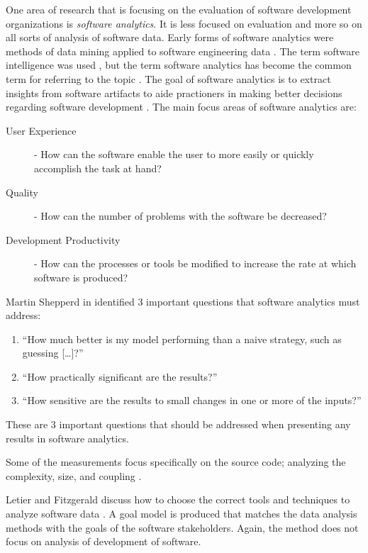 \documentclass[SDSUThesis.tex]{subfiles}
\begin{document}
One area of research that is focusing on the evaluation of software development organizations
is \textit{software analytics}.  It is less focused on evaluation
and more so on all sorts of analysis of software data.  Early forms of 
software analytics were methods of data mining applied to software engineering data
\cite{Kaner2004,Xie2009,Taylor2010,Halkidi2011}. The term software intelligence was 
used \cite{Hassan2010}, but
the term software analytics has become the common term for referring to the topic \cite{Zhang2011}.
The goal of software analytics is to extract insights
from software artifacts to aide practioners in making better decisions regarding software
development \cite{Zhang2013}.  The main focus areas of software analytics are:
\begin{description}
    \item[User Experience] - How can the software enable the user to more easily or quickly 
        accomplish the task at hand?
    \item[Quality] - How can the number of problems with the software be decreased?
    \item[Development Productivity] - How can the processes or tools be modified to increase 
        the rate at which software is produced? 
\end{description}

Martin Shepperd in \cite{Hassan2013} identified 3 important questions that software
analytics must address:
\begin{enumerate}
    \item ``How much better is my model performing than a naive strategy, such as guessing [\ldots]?''
    \item ``How practically significant are the results?''
    \item ``How sensitive are the results to small changes in one or more of the inputs?''
\end{enumerate}
These are 3 important questions that should be addressed when presenting any results in
software analytics.

Some of the measurements focus specifically on the source code; analyzing the 
complexity, size, and coupling \cite{Tosi2012}. 

Letier and Fitzgerald discuss how to choose the correct tools and techniques to analyze
software data \cite{Letier2013}.  A goal model is produced that matches the data analysis methods
with the goals of the software stakeholders.  Again, the method does not focus
on analysis of development of software.
\end{document}
